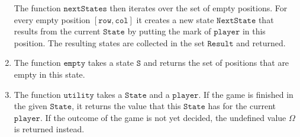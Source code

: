 \begin{enumerate}
      The function $\texttt{nextStates}$ then iterates over the set of empty positions. For every 
      empty position $[\texttt{row}, \texttt{col}]$ it creates a new state $\texttt{NextState}$ that results
      from the current $\texttt{State}$ by putting the mark of $\texttt{player}$ in this position.  
      The resulting states are collected in the set $\texttt{Result}$ and returned.
\item The function $\texttt{empty}$ takes a state $\texttt{S}$ and returns the set of positions that are empty
      in this state.
\item The function $\texttt{utility}$ takes a $\texttt{State}$ and a $\texttt{player}$.  If the game is 
      finished in the given $\texttt{State}$, it returns the value that this $\texttt{State}$ has for the
      current $\texttt{player}$.  If the outcome of the game is not yet decided, the undefined value $\Omega$
      is returned instead. 
 

\end{enumerate}
